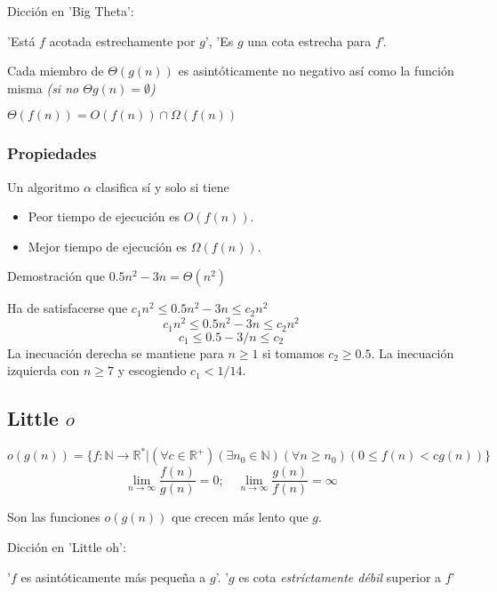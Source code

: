 \documentclass[tikz,11pt,fleqn]{book} %
\begin{document}
\begin{remark}Dicción en 'Big Theta':

	'Está $f$ acotada estrechamente por $g$', 'Es $g$ una cota estrecha para $f$'.
\end{remark}
Cada miembro de $\Theta(g(n))$ es asintóticamente no negativo así como la función misma \textit{(si no $\Theta{g(n)}=\emptyset$)}

\begin{theorem}
	$\Theta(f(n)) =O(f(n))\cap \Omega(f(n))$
\end{theorem}

\subsubsection{Propiedades}
Un algoritmo $\alpha$ clasifica sí y solo si tiene
\begin{itemize}
	\item Peor tiempo de ejecución es $O(f(n)).$
	\item Mejor tiempo de ejecución es $\Omega(f(n)).$
\end{itemize}

\begin{example}
	Demostración que $0.5n^2-3n=\Theta(n^2)$

	Ha de satisfacerse que $c_1n^2\le 0.5n^2-3n\le c_2n^2$
	$$
		c_1n^2\le 0.5n^2-3n\le c_2n^2
	$$$$
		c_1\le 0.5-3/n\le c_2
	$$
	La inecuación derecha se mantiene para $n\ge1$ si tomamos $c_2\ge0.5$. La inecuación izquierda con $n\ge7$ y escogiendo $c_1<1/14$.
\end{example}

\subsection{Little $o$}
\begin{definition}
	$$
		o (g(n)) = \{ f : \mathbb N \to \mathbb R^* | (\forall c \in \mathbb R^+) (\exists n_0\in \mathbb N) (\forall n\ge n_0) ( 0 \le  f(n) < cg (n) ) \}
	$$$$
		\lim_{n\to\infty}\frac{f(n)}{g(n)} = 0;\quad
		\lim_{n\to\infty}\frac{g(n)}{f(n)}= \infty
	$$
\end{definition}
Son las funciones $o(g(n))$ que crecen más lento que $g$.
\begin{remark}Dicción en 'Little oh':

	'$f$ es asintóticamente más pequeña a $g$'. '$g$ es cota \textit{estríctamente débil} superior a $f$'
\end{remark}
\end{document}
